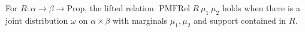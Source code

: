\begin{definition}
  \label{def:pmfrel}
  \leanok
  For $R : \alpha \to \beta \to \mathrm{Prop}$, the lifted relation
  $\operatorname{PMFRel} R\ \mu_1\ \mu_2$ holds when there is a joint distribution
  $\omega$ on $\alpha \times \beta$ with marginals $\mu_1, \mu_2$ and support
  contained in $R$.
\end{definition}
